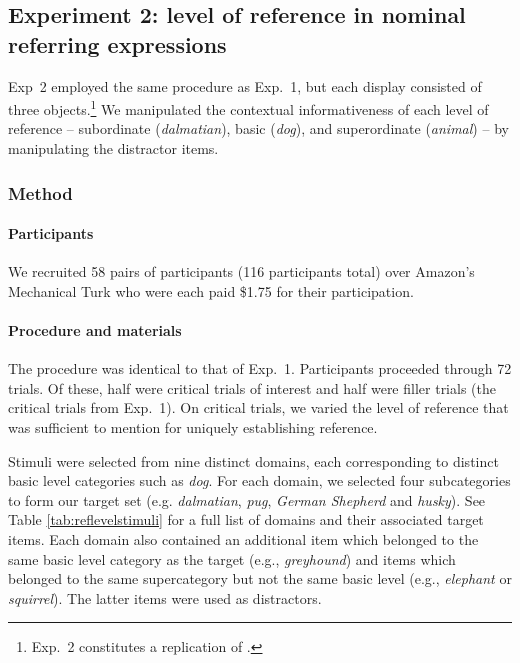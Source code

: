 \documentclass[11pt]{article}
\newcommand{\tableref}[1]{Table \ref{#1}}
\begin{document}
\subsection{Experiment 2: level of reference in nominal referring expressions}
\label{sec:exp2}

Exp~2 employed the same procedure as Exp.~1, but each display consisted of three objects.\footnote{Exp.~2 constitutes a replication of .} We manipulated the contextual informativeness of each level of reference -- subordinate (\emph{dalmatian}), basic (\emph{dog}), and superordinate (\emph{animal}) -- by manipulating the distractor items. 

\subsubsection{Method}

\paragraph{Participants}

We recruited 58 pairs of participants (116 participants total) over Amazon's Mechanical Turk who were each paid \$1.75 for their participation. 

\paragraph{Procedure and materials}

The procedure was identical to that of Exp.~1. Participants proceeded through 72 trials. Of these, half were critical trials of interest and half were filler trials (the critical trials from Exp.~1). On critical trials, we varied the level of reference that was sufficient to mention for uniquely establishing reference.

Stimuli were selected from nine distinct domains, each corresponding to distinct basic level categories such as \emph{dog}.  For each domain, we selected four subcategories to form our target set (e.g. \emph{dalmatian}, \emph{pug}, \emph{German Shepherd} and \emph{husky}). See \tableref{tab:reflevelstimuli} for a full list of domains and their associated target items. Each domain also contained an additional item which belonged to the same basic level category as the target (e.g., \emph{greyhound}) and items which belonged to the same supercategory but not the same basic level (e.g., \emph{elephant} or \emph{squirrel}). The latter items were used as distractors.
\end{document}
